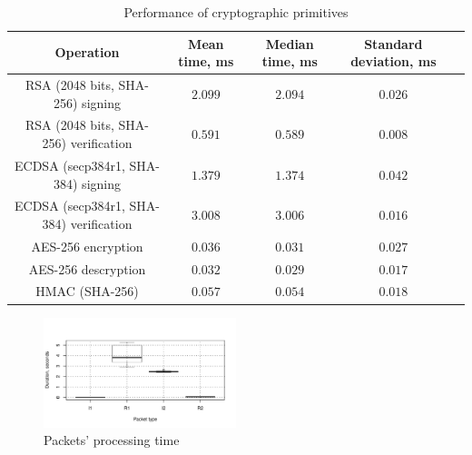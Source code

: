 \begin{table}
\centering
\begin{tabular}{|c|c|c|c|c|}
\hline
\bf{Operation} & \bf{Mean time, ms} & \bf{Median time, ms} & \bf{Standard deviation, ms}\\\hline\hline
RSA (2048 bits, SHA-256) signing					&    $2.099$                        & $2.094$               & $0.026$                  \\
RSA (2048 bits, SHA-256) verification			&    $0.591$                        & $0.589$               & $0.008$                  \\
ECDSA (secp384r1, SHA-384) signing		&    $1.379$                        & $1.374$               & $0.042$                  \\
ECDSA (secp384r1, SHA-384) verification	&    $3.008$                        & $3.006$               & $0.016$                  \\
AES-256 encryption  &    $0.036$                  & $0.031$         & $0.027$           \\
AES-256 descryption &	 $0.032$ 				  & $0.029$         & $0.017$           \\
HMAC (SHA-256)      &    $0.057$                  & $0.054$         & $0.018$           \\
\hline
\end{tabular}
\caption{Performance of cryptographic primitives}
\label{tab:micro}
\end{table}

\begin{figure}
	\includegraphics[width=0.5\textwidth]{graphics/packet_processing.pdf}
	\caption{Packets' processing time}
	\label{fig:packet_processing}
\end{figure}

